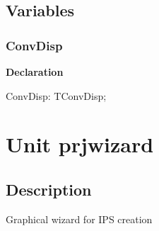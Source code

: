 \documentclass{report}
\newif\ifpdf
\begin{document}
\section{Variables}
\ifpdf
\subsection*{\large{\textbf{ConvDisp}}\normalsize\hspace{1ex}\hrulefill}
\else
\subsection*{ConvDisp}
\fi
\label{pkgconvertdisp-ConvDisp}
\begin{list}{}{
\setlength{\itemindent}{0cm}
\setlength{\listparindent}{0cm}
\setlength{\leftmargin}{\evensidemargin}
\addtolength{\leftmargin}{\tmplength}
\settowidth{\labelsep}{X}
\addtolength{\leftmargin}{\labelsep}
\setlength{\labelwidth}{\tmplength}
}
\item[\textbf{Declaration}\hfill]
\ifpdf
\begin{flushleft}
\fi
\begin{ttfamily}
ConvDisp: TConvDisp;\end{ttfamily}

\ifpdf
\end{flushleft}
\fi

\end{list}
\chapter{Unit prjwizard}
\label{prjwizard}
\section{Description}
Graphical wizard for IPS creation
\end{document}
